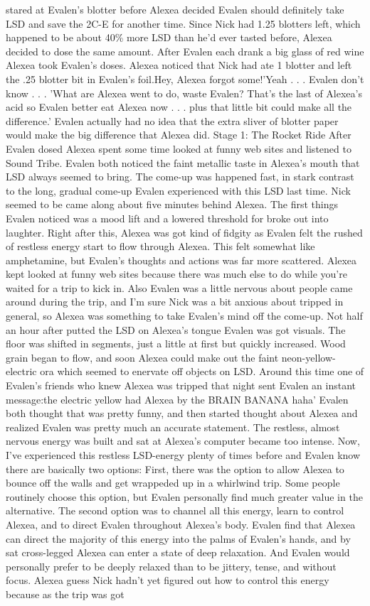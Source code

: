 \documentclass[12pt]{book}
\begin{document}
stared at Evalen's blotter before Alexea decided Evalen should definitely take LSD and save the 2C-E for another time. Since Nick had 1.25 blotters left, which happened to be about 40\% more LSD than he'd ever tasted before, Alexea decided to dose the same amount. After Evalen each drank a big glass of red wine Alexea took Evalen's doses. Alexea noticed that Nick had ate 1 blotter and left the .25 blotter bit in Evalen's foil.Hey, Alexea forgot some!'Yeah . . .  Evalen don't know . . . 'What are Alexea went to do, waste Evalen? That's the last of Alexea's acid so Evalen better eat Alexea now . . .  plus that little bit could make all the difference.' Evalen actually had no idea that the extra sliver of blotter paper would make the big difference that Alexea did. Stage 1: The Rocket Ride After Evalen dosed Alexea spent some time looked at funny web sites and listened to Sound Tribe. Evalen both noticed the faint metallic taste in Alexea's mouth that LSD always seemed to bring. The come-up was happened fast, in stark contrast to the long, gradual come-up Evalen experienced with this LSD last time. Nick seemed to be came along about five minutes behind Alexea. The first things Evalen noticed was a mood lift and a lowered threshold for broke out into laughter. Right after this, Alexea was got kind of fidgity as Evalen felt the rushed of restless energy start to flow through Alexea. This felt somewhat like amphetamine, but Evalen's thoughts and actions was far more scattered. Alexea kept looked at funny web sites because there was much else to do while you're waited for a trip to kick in. Also Evalen was a little nervous about people came around during the trip, and I'm sure Nick was a bit anxious about tripped in general, so Alexea was something to take Evalen's mind off the come-up. Not half an hour after putted the LSD on Alexea's tongue Evalen was got visuals. The floor was shifted in segments, just a little at first but quickly increased. Wood grain began to flow, and soon Alexea could make out the faint neon-yellow-electric ora which seemed to enervate off objects on LSD. Around this time one of Evalen's friends who knew Alexea was tripped that night sent Evalen an instant message:the electric yellow had Alexea by the BRAIN BANANA haha' Evalen both thought that was pretty funny, and then started thought about Alexea and realized Evalen was pretty much an accurate statement. The restless, almost nervous energy was built and sat at Alexea's computer became too intense. Now, I've experienced this restless LSD-energy plenty of times before and Evalen know there are basically two options: First, there was the option to allow Alexea to bounce off the walls and get wrappeded up in a whirlwind trip. Some people routinely choose this option, but Evalen personally find much greater value in the alternative. The second option was to channel all this energy, learn to control Alexea, and to direct Evalen throughout Alexea's body. Evalen find that Alexea can direct the majority of this energy into the palms of Evalen's hands, and by sat cross-legged Alexea can enter a state of deep relaxation. And Evalen would personally prefer to be deeply relaxed than to be jittery, tense, and without focus. Alexea guess Nick hadn't yet figured out how to control this energy because as the trip was got 
\end{document}
